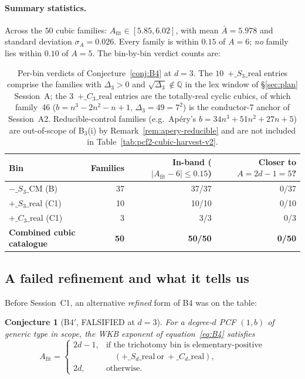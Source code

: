 \documentclass[11pt,a4paper]{article}
\newtheorem{conjecture}{Conjecture}
\theoremstyle{definition}
\theoremstyle{remark}
\newcommand{\Q}{\mathbb{Q}}
\begin{document}


\paragraph{Summary statistics.}
Across the $50$ cubic families: $A_{\mathrm{fit}}\in[5.85, 6.02]$, with
mean $\bar{A}=5.978$ and standard deviation $\sigma_{A}=0.026$. Every
family is within $0.15$ of $A=6$; \emph{no} family lies within $0.10$
of $A=5$. The bin-by-bin verdict counts are:

\begin{table}[ht]
\centering
\small
\begin{tabular}{lrrr}
\toprule
Bin & Families & In-band ($|A_{\mathrm{fit}}-6|\le 0.15$) & Closer to $A=2d-1=5$? \\
\midrule
$-\_S_3\_\mathrm{CM}$ (B)        & 37 & 37/37 & 0/37 \\
$+\_S_3\_\mathrm{real}$ (C1)     & 10 & 10/10 & 0/10 \\
$+\_C_3\_\mathrm{real}$ (C1)     &  3 &  3/3  & 0/3 \\
\midrule
\textbf{Combined cubic catalogue} & \textbf{50} & \textbf{50/50} & \textbf{0/50} \\
\bottomrule
\end{tabular}
\caption{Per-bin verdicts of Conjecture~\ref{conj:B4} at $d=3$. The
$10$~$+\_S_3\_\mathrm{real}$ entries comprise the families with
$\Delta_{3}>0$ and $\sqrt{\Delta_{3}}\notin\Q$ in the lex window of
\S\ref{sec:plan} Session~A; the $3$~$+\_C_3\_\mathrm{real}$ entries are
the totally-real cyclic cubics, of which family~46
($b=n^{3}-2n^{2}-n+1$, $\Delta_3=49=7^{2}$) is the conductor-7 anchor
of Session~A2. Reducible-control families (e.g.\ Ap\'ery's
$b=34n^{3}+51n^{2}+27n+5$) are out-of-scope of B$_{3}$(i) by
Remark~\ref{rem:apery-reducible} and are not included in
Table~\ref{tab:pcf2-cubic-harvest-v2}.}
\label{tab:pcf2-bin-verdicts}
\end{table}

\subsection{A failed refinement and what it tells us}\label{sec:B4-prime-falsified}

Before Session~C1, an alternative \emph{refined} form of B4 was on the
table:

\begin{conjecture}[B4$'$, FALSIFIED at $d=3$]\label{conj:B4prime}
For a degree-$d$ PCF $(1,b)$ of generic type in scope, the WKB exponent
of equation~\eqref{eq:B4} satisfies
\[
A_{\mathrm{fit}}=
\begin{cases}
2d-1, & \text{if the trichotomy bin is elementary-positive}\\
       & \quad (+\_S_d\_\mathrm{real}\ \text{or}\ +\_C_d\_\mathrm{real}),\\
2d, & \text{otherwise.}
\end{cases}
\]
\end{conjecture}
\end{document}
